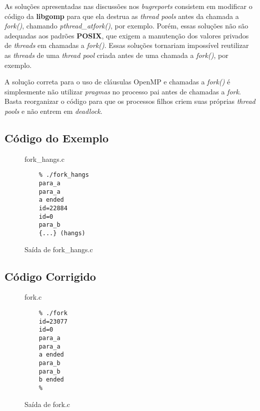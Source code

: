\documentclass[a4paper, 12pt]{article}
\begin{document}
As soluções apresentadas nas discussões nos \textit{bugreports} consistem
em modificar o código da \textbf{libgomp} para que ela destrua as
\textit{thread pools} antes da chamada a \textit{fork()}, chamando
\textit{pthread\_atfork()}, por exemplo. Porém, essas soluções não são
adequadas aos padrões \textbf{POSIX}, que exigem a manutenção dos valores
privados de \textit{threads} em chamadas a \textit{fork()}. Essas soluções
tornariam impossível reutilizar as \textit{threads} de uma \textit{thread pool}
criada antes de uma chamada a \textit{fork()}, por exemplo.

A solução correta para o uso de cláusulas OpenMP e chamadas a \textit{fork()}
é simplesmente não utilizar \textit{pragmas} no processo pai antes de
chamadas a \textit{fork}. Basta reorganizar o código para que os processos
filhos criem suas próprias \textit{thread pools} e não entrem em
\textit{deadlock}.

\newpage
\subsection{Código do Exemplo}\label{sec:example}
\begin{figure}[H]
    \centering
    
    \caption{fork\_hangs.c}
    \label{fig:fork_hangs}
\end{figure}

\begin{figure}[H]
    \centering
    \begin{lstlisting}
    % ./fork_hangs
    para_a
    para_a
    a ended
    id=22884
    id=0
    para_b
    {...} (hangs)
    \end{lstlisting}
    \caption{Saída de fork\_hangs.c}
    \label{fig:fork_hangs_out}
\end{figure}

\newpage
\subsection{Código Corrigido}\label{sec:fixed}
\begin{figure}[H]
    \centering
    
    \caption{fork.c}
    \label{fig:fork}
\end{figure}

\begin{figure}[H]
    \centering
    \begin{lstlisting}
    % ./fork
    id=23077
    id=0
    para_a
    para_a
    a ended
    para_b
    para_b
    b ended
    %
    \end{lstlisting}
    \caption{Saída de fork.c}
    \label{fig:fork_out}
\end{figure}
\newpage
\end{document}
